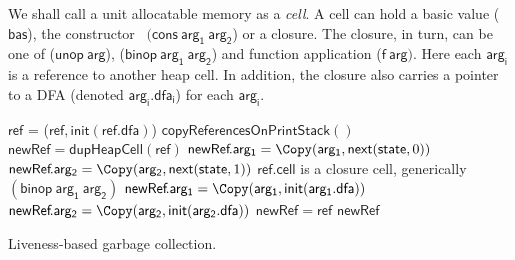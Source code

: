 \documentclass[preprint,9pt]{sigplanconf}
\begin{document}
We shall call a  unit allocatable memory as a {\em  cell}.  A cell can
hold    a    basic    value    ($\mathsf{bas}$),    the    constructor
\CONS\ $(\mathsf{cons~  arg_1~arg_2}$) or a closure.   The closure, in
turn,    can    be    one   of    ($\mathsf{unop~arg}$),    ($\mathsf{
  binop~arg_1~arg_2}$)  and  function application  ($\mathsf{f~arg})$.
Here each $\mathsf{  arg_i}$ is a reference to another  heap cell.  In
addition, the closure also carries  a pointer to a DFA (denoted
$\mathsf{arg_i.dfa_i}$) for each $\mathsf{arg_i}$.


\label{sec:live-clo}
  \SetStartEndCondition{ }{}{}%
  \AlgoDontDisplayBlockMarkers\SetAlgoNoEnd\SetAlgoNoLine%
\begin{algorithm}[t]
  \Pro{\Lgc{}}
     {
            {$\mathsf{ref}$ = \Copy($\mathsf{ref}, \mathsf{init}(\mathsf{ref.dfa})$)\;}
            ${\mathsf{copyReferencesOnPrintStack}()}$\;  
     }
        {
             {
               $\mathsf{newRef} = \mathsf{dupHeapCell}(\mathsf{ref})$\;
                  {
                    {
                      $\mathsf{newRef}\!.\mathsf{arg_1}  = \Copy(\mathsf{arg_1}, \mathsf{next}(\mathsf{state}, 0))$\;
                    }
                    {
                      $\mathsf{newRef}\!.\mathsf{arg_2} =  \Copy(\mathsf{arg_2},
                      \mathsf{next}(\mathsf{state} , 1))$\;
                    }    
                  }
               \If
                  {$\mathsf{ref\!.cell}$ is a
                    closure cell, generically  $\mathsf{(binop~arg_1~arg_2)}$}
                   { 
                     $\mathsf{newRef}\!.\mathsf{arg_1} = \Copy(\mathsf{arg_1}, \mathsf{init}(\mathsf{arg_1.dfa}))$\;
                     $\mathsf{newRef}\!.\mathsf{arg_2} = \Copy(\mathsf{arg_2}, \mathsf{init}(\mathsf{arg_2.dfa}))$\;
                   }
             }
             {$\mathsf{newRef = ref}$}
\KwRet $\mathsf{newRef}$\;
        }
        \caption{Liveness-based
          garbage collection.  \label{algo:lgc-a}}
\end{algorithm}
\end{document}
